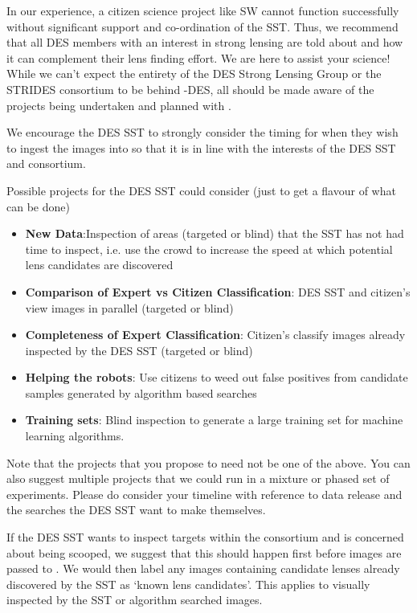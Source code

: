 \documentclass[a4paper,twocolumn]{article}
\begin{document}
In our experience, a citizen science project like SW cannot function successfully without significant support and co-ordination of the SST. Thus, we recommend that all DES members with an interest in strong lensing are told about \SW and how it can complement their lens finding effort. We are here to assist your science! While we can't expect the entirety of the DES Strong Lensing Group or the STRIDES consortium to be behind \SW-DES, all should be made aware of the projects being undertaken and planned with \SW.

We encourage the DES SST to strongly consider the timing for when they wish to ingest the images into \SW so that it is in line with the interests of the DES SST and consortium.

Possible projects for the DES SST could consider (just to get a flavour of what can be done)
\begin{itemize}
\item \textbf{New Data}:Inspection of areas (targeted or blind) that the SST has not had time to inspect, i.e. use the crowd to increase the speed at which potential lens candidates are discovered
\item \textbf{Comparison of Expert vs Citizen Classification}: DES SST and citizen's view images in parallel (targeted or blind)
\item \textbf{Completeness of Expert Classification}: Citizen's classify images already inspected by the DES SST (targeted or blind)
\item \textbf{Helping the robots}: Use citizens to weed out false positives from candidate samples generated by algorithm based searches
\item \textbf{Training sets}: Blind inspection to generate a large training set for  machine learning algorithms.
\end{itemize}

Note that the projects that you propose to \SW need not be one of the above. You can also suggest multiple projects that we could run in a mixture or phased set of experiments. Please do consider your timeline with reference to data release and the searches the DES SST want to make themselves.

If the DES SST wants to inspect targets within the consortium and is concerned about being scooped, we suggest that this should happen first before images are passed to \SW. We would then label any images containing candidate lenses already discovered by the SST as `known lens candidates'. This applies to visually inspected by the SST or algorithm searched images. 
\end{document}
